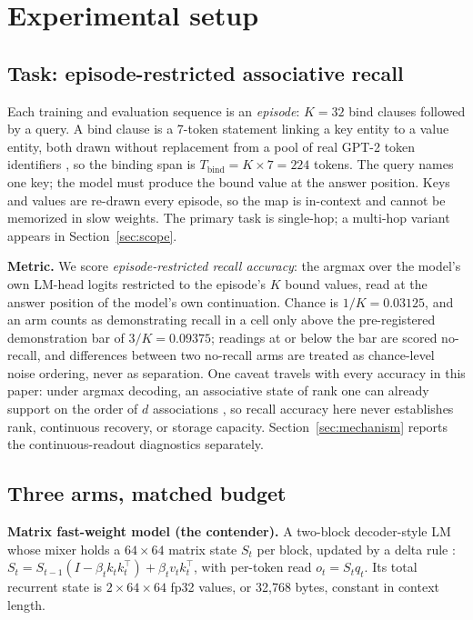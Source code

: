 \section{Experimental setup}
\label{sec:setup}

\subsection{Task: episode-restricted associative recall}

Each training and evaluation sequence is an \emph{episode}: $K = 32$ bind
clauses followed by a query. A bind clause is a 7-token statement linking a
key entity to a value entity, both drawn without replacement from a pool of
real GPT-2 token identifiers \citep{radford2019language}, so the binding
span is $T_{\mathrm{bind}} = K \times 7 = 224$
tokens. %
The query names one key; the model must produce the bound value at the
answer position. Keys and values are re-drawn every episode, so the map is
in-context and cannot be memorized in slow weights. The primary task is
single-hop; a multi-hop variant appears in Section~\ref{sec:scope}.

\textbf{Metric.} We score \emph{episode-restricted recall accuracy}: the
argmax over the model's own LM-head logits restricted to the episode's $K$
bound values, read at the answer position of the model's own continuation.
Chance is $1/K = 0.03125$, and an arm counts as demonstrating recall in a
cell only above the pre-registered demonstration bar of $3/K = 0.09375$;
readings at or below the bar are scored no-recall, and differences between
two no-recall arms are treated as chance-level noise ordering, never as
separation. One caveat travels with every accuracy in this paper: under
argmax decoding, an associative state of rank one can already support on
the order of $d$ associations \citep{nichani2024understanding}, so recall
accuracy here never establishes rank, continuous recovery, or storage
capacity. Section~\ref{sec:mechanism} reports the continuous-readout
diagnostics separately.

\subsection{Three arms, matched budget}

\textbf{Matrix fast-weight model (the contender).} A two-block
decoder-style LM whose mixer holds
a $64 \times 64$ matrix state $S_t$ per block, updated by a delta rule
\citep{schlag2021linear, yang2024parallelizing}:
$S_t = S_{t-1}(I - \beta_t k_t k_t^{\top}) + \beta_t v_t k_t^{\top}$, with
per-token read $o_t = S_t q_t$. Its total recurrent state is
$2 \times 64 \times 64$ fp32 values, or 32{,}768 bytes, constant in context
length. %

